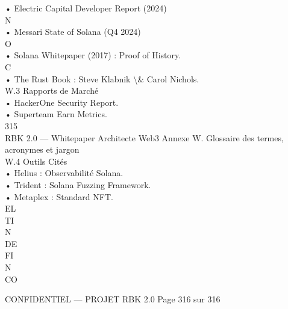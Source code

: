 \documentclass[12pt,landscape,a4paper]{article}
\newenvironment{confidential}
{\begin{tcolorbox}[
    colback=rbkred!5!white,
    colframe=rbkred!75!black,
    title=CONFIDENTIEL,
    fonttitle=\bfseries\color{white},
    coltitle=rbkred!75!black,
    breakable,
    enhanced,
    frame hidden,
    borderline west={2pt}{0pt}{rbkred!75!black}
]}
{\end{tcolorbox}}
\begin{document}
• Electric Capital Developer Report (2024)\\
N\\
• Messari State of Solana (Q4 2024)\\
O\\
• Solana Whitepaper (2017) : Proof of History.\\
C\\
\vspace{0.5em}
• The Rust Book : Steve Klabnik \textbackslash{}& Carol Nichols.\\
\vspace{0.5em}
\vspace{0.5em}
\vspace{0.5em}
W.3 Rapports de Marché\\
• HackerOne Security Report.\\
• Superteam Earn Metrics.\\
\vspace{0.5em}
\vspace{0.5em}
\vspace{0.5em}
\vspace{0.5em}
315\\
RBK 2.0 — Whitepaper Architecte Web3                                Annexe W. Glossaire des termes, acronymes et jargon\\
\vspace{0.5em}
\vspace{0.5em}
\vspace{0.5em}
W.4 Outils Cités\\
• Helius : Observabilité Solana.\\
• Trident : Solana Fuzzing Framework.\\
• Metaplex : Standard NFT.\\
\vspace{0.5em}
\vspace{0.5em}
\vspace{0.5em}
\vspace{0.5em}
EL\\
TI\\
N\\
DE\\
FI\\
N\\
CO\\
\vspace{0.5em}
\vspace{0.5em}
\vspace{0.5em}
\vspace{0.5em}
\begin{confidential}CONFIDENTIEL — PROJET RBK 2.0                    Page 316 sur 316\end{confidential}
\vspace{0.5em}
\end{document}
